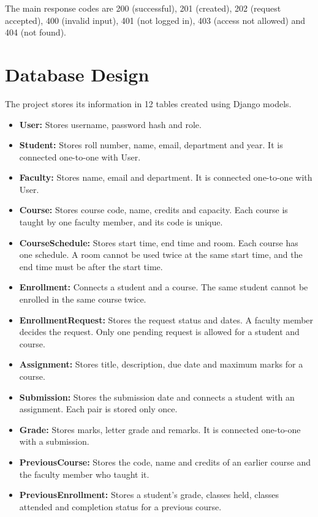 \documentclass[11pt,a4paper]{article}
\begin{document}
The main response codes are 200 (successful), 201 (created), 202 (request
accepted), 400 (invalid input), 401 (not logged in), 403 (access not allowed)
and 404 (not found).

\section{Database Design}

The project stores its information in 12 tables created using Django models.

\begin{itemize}
    \item \textbf{User:} Stores username, password hash and role.
    \item \textbf{Student:} Stores roll number, name, email, department and year.
    It is connected one-to-one with User.
    \item \textbf{Faculty:} Stores name, email and department. It is connected
    one-to-one with User.
    \item \textbf{Course:} Stores course code, name, credits and capacity. Each
    course is taught by one faculty member, and its code is unique.
    \item \textbf{CourseSchedule:} Stores start time, end time and room. Each
    course has one schedule. A room cannot be used twice at the same start time,
    and the end time must be after the start time.
    \item \textbf{Enrollment:} Connects a student and a course. The same student
    cannot be enrolled in the same course twice.
    \item \textbf{EnrollmentRequest:} Stores the request status and dates. A
    faculty member decides the request. Only one pending request is allowed
    for a student and course.
    \item \textbf{Assignment:} Stores title, description, due date and maximum
    marks for a course.
    \item \textbf{Submission:} Stores the submission date and connects a student
    with an assignment. Each pair is stored only once.
    \item \textbf{Grade:} Stores marks, letter grade and remarks. It is connected
    one-to-one with a submission.
    \item \textbf{PreviousCourse:} Stores the code, name and credits of an
    earlier course and the faculty member who taught it.
    \item \textbf{PreviousEnrollment:} Stores a student's grade, classes held,
    classes attended and completion status for a previous course.
\end{itemize}
\end{document}
